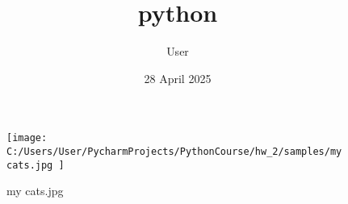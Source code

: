 \documentclass{article}
\title{python}
\author{ User }
\date{ 28 April 2025 }
\begin{document}
\begin{figure}
    \centering
    \texttt{[image:  C:/Users/User/PycharmProjects/PythonCourse/hw\_2/samples/my cats.jpg ]}
    \caption{ my cats.jpg }
    \label{fig:enter-label}
\end{figure}
\end{document}
